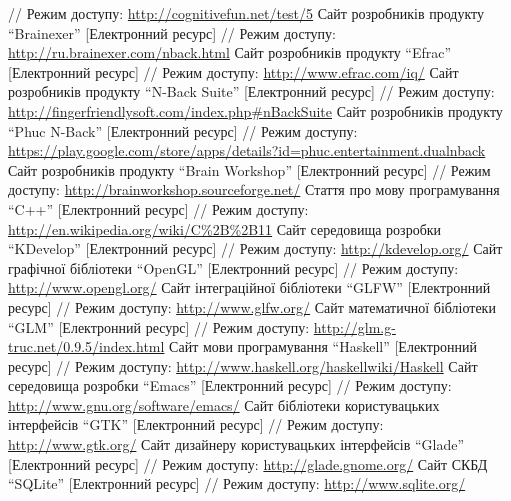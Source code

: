 \begin{thebibliography}{99}
  // Режим доступу: \url{http://cognitivefun.net/test/5}
  Сайт розробників продукту ``Brainexer'' [Електронний ресурс]
  // Режим доступу: \url{http://ru.brainexer.com/nback.html}
  Сайт розробників продукту ``Efrac'' [Електронний ресурс]
  // Режим доступу: \url{http://www.efrac.com/iq/}
  Сайт розробників продукту ``N-Back Suite'' [Електронний ресурс]
  // Режим доступу: \url{http://fingerfriendlysoft.com/index.php#nBackSuite}
  Сайт розробників продукту ``Phuc N-Back'' [Електронний ресурс]
  // Режим доступу: \url{https://play.google.com/store/apps/details?id=phuc.entertainment.dualnback}
  Сайт розробників продукту ``Brain Workshop'' [Електронний ресурс]
  // Режим доступу: \url{http://brainworkshop.sourceforge.net/}
  Стаття про мову програмування ``C++'' [Електронний ресурс]
  // Режим доступу: \url{http://en.wikipedia.org/wiki/C%2B%2B11}
  Сайт середовища розробки ``KDevelop'' [Електронний ресурс]
  // Режим доступу: \url{http://kdevelop.org/}
  Сайт графічної бібліотеки ``OpenGL'' [Електронний ресурс]
  // Режим доступу: \url{http://www.opengl.org/}
  Сайт інтеграційної бібліотеки ``GLFW'' [Електронний ресурс]
  // Режим доступу: \url{http://www.glfw.org/}
  Сайт математичної бібліотеки ``GLM'' [Електронний ресурс]
  // Режим доступу: \url{http://glm.g-truc.net/0.9.5/index.html}
  Сайт мови програмування ``Haskell'' [Електронний ресурс]
  // Режим доступу: \url{http://www.haskell.org/haskellwiki/Haskell}
  Сайт середовища розробки ``Emacs'' [Електронний ресурс]
  // Режим доступу: \url{http://www.gnu.org/software/emacs/}
  Сайт бібліотеки користувацьких інтерфейсів ``GTK'' [Електронний ресурс]
  // Режим доступу: \url{http://www.gtk.org/}
  Сайт дизайнеру користувацьких інтерфейсів ``Glade'' [Електронний ресурс]
  // Режим доступу: \url{http://glade.gnome.org/}
  Сайт СКБД ``SQLite'' [Електронний ресурс]
  // Режим доступу: \url{http://www.sqlite.org/}
\end{thebibliography}